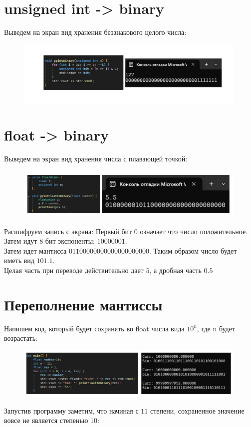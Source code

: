 \documentclass[a4paper,12pt]{article} %
\begin{document}
\section{unsigned int -> binary}
Выведем на экран вид хранения беззнакового целого числа:
\begin{figure}[H]
    \centering
    \includegraphics[width=0.99\textwidth]{0.jpg}
\end{figure} 
\section{float -> binary}
Выведем на экран вид хранения числа с плавающей точкой:
\begin{figure}[H]
    \centering
    \includegraphics[width=0.99\textwidth]{1.jpg}
\end{figure} 
Расшифруем запись с экрана: Первый бит $0$ означает что число положительное. Затем идут $8$ бит экспоненты: $10000001$.\\
Затем идет мантисса $01100000000000000000000$. Таким образом число будет иметь вид $101.1$.\\
Целая часть при переводе действительно дает $5$, а дробная часть $0.5$

\section{Переполнение мантиссы}
Напишем код, который будет сохранять во float числа вида $10^n$, где n будет возрастать:

\begin{figure}[H]
    \centering
    \includegraphics[width=0.99\textwidth]{2.jpg}
\end{figure} 
Запустив программу заметим, что начиная с $11$ степени, сохраненное значение вовсе не является степенью $10$:
\end{document}
